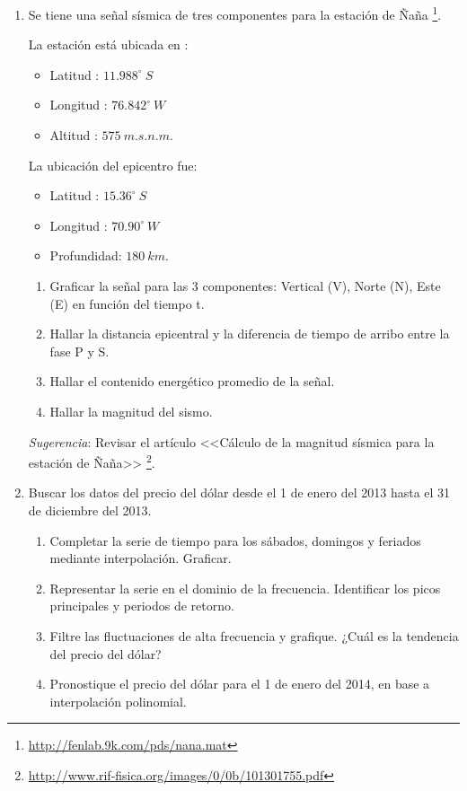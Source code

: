 \documentclass[a4paper,11pt,final]{article}
\begin{document}
\begin{enumerate}
      \emph{Sugerencia}: Revisar el artículo <<Estimación del nivel medio de bajamares de sicigias ordinarias en la bahía de Paracas>>
      \footnote{\url{http://www.rif-fisica.org/images/1/11/111402401.pdf}}.

    \item Se tiene una señal sísmica de tres componentes para la estación de
      Ñaña \footnote{\url{http://fenlab.9k.com/pds/nana.mat}}.

      La estación está ubicada en :

      \begin{itemize}
        \item Latitud  : $11.988^\circ\ S$
        \item Longitud : $76.842^\circ\ W$
        \item Altitud  : $575\ m.s.n.m$.
      \end{itemize}

      La ubicación del epicentro fue:

      \begin{itemize}
        \item Latitud    : $15.36^\circ\ S$
        \item Longitud   : $70.90^\circ\ W$
        \item Profundidad: $180\ km$.
      \end{itemize}

      \begin{enumerate}
        \item Graficar la señal para las 3 componentes: Vertical (V), Norte (N), Este (E) en función del tiempo t.
        \item Hallar la distancia epicentral y la diferencia de tiempo de arribo entre la fase P y S.
        \item Hallar el contenido energético promedio de la señal.
        \item Hallar la magnitud del sismo.
      \end{enumerate}

      \emph{Sugerencia}: Revisar el artículo <<Cálculo de la magnitud sísmica para la estación de Ñaña>>
      \footnote{\url{http://www.rif-fisica.org/images/0/0b/101301755.pdf}}.

    \item Buscar los datos del precio del dólar desde el 1 de enero del 2013
      hasta el 31 de diciembre del 2013.

      \begin{enumerate}
        \item Completar la serie de tiempo para los sábados, domingos y feriados mediante interpolación. Graficar.
        \item Representar la serie en el dominio de la frecuencia. Identificar los picos principales y periodos de retorno.
        \item Filtre las fluctuaciones de alta frecuencia y grafique. ¿Cuál es la tendencia del precio del dólar?
        \item Pronostique el precio del dólar para el 1 de enero del 2014, en base a interpolación polinomial.
      \end{enumerate}

  \end{enumerate}
\end{document}
